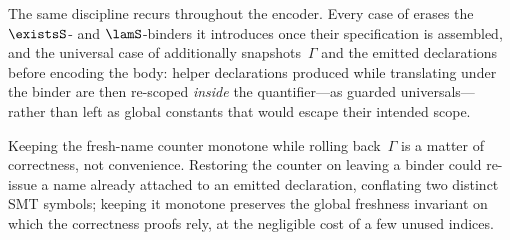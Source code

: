 The same discipline recurs throughout the encoder. Every case of
{\small{}} erases the
$\existsS$- and $\lamS$-binders it introduces once their specification is assembled,
and the universal case of {\small{}}
additionally snapshots~$\Gamma$ and the emitted declarations before encoding the
body: helper declarations produced while translating under the binder are then
re-scoped \emph{inside} the quantifier---as guarded universals---rather than left as
global constants that would escape their intended scope.

\begin{note}
  Keeping the fresh-name counter monotone while rolling back~$\Gamma$ is a matter of
  correctness, not convenience. Restoring the counter on leaving a binder could
  re-issue a name already attached to an emitted declaration, conflating two
  distinct SMT symbols; keeping it monotone preserves the global freshness invariant
  on which the correctness proofs rely, at the negligible cost of a few unused
  indices.
\end{note}
